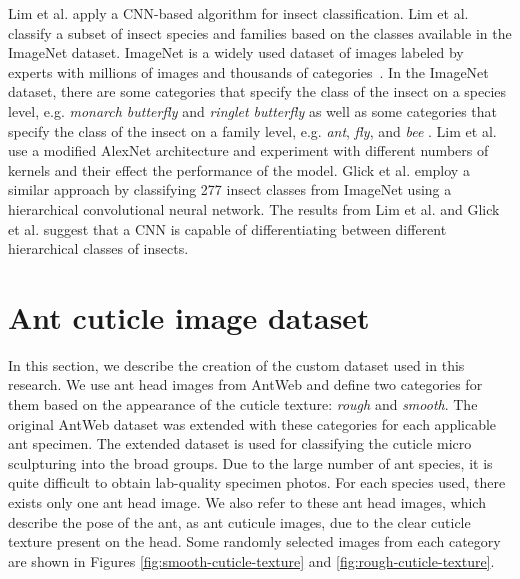 \documentclass{aci}
\numberwithin{equation}{section}
\begin{document}
Lim et al. \cite{lim_performance_2017} apply a CNN-based algorithm for insect
classification. Lim et al. \cite{lim_performance_2017} classify a subset of
insect species and families based on the classes available in the ImageNet
dataset. ImageNet is a widely used dataset of images labeled by experts with
millions of images and thousands of categories~\cite{deng_imagenet_2009}. In the
ImageNet dataset, there are some categories that specify the class of the insect
on a species level, e.g. \textit{monarch butterfly} and \textit{ringlet
    butterfly} as well as some categories that specify the class of the insect on a
family level, e.g. \textit{ant}, \textit{fly}, and \textit{bee}
\cite{deng_imagenet_2009}. Lim et al. \cite{lim_performance_2017} use a modified
AlexNet architecture and experiment with different numbers of kernels and their
effect the performance of the model. Glick et al. \cite{glick_insect_2016}
employ a similar approach by classifying 277 insect classes from ImageNet using
a hierarchical convolutional neural network. The results from Lim et al.
\cite{lim_performance_2017} and Glick et al. \cite{glick_insect_2016} suggest
that a CNN is capable of differentiating between different hierarchical classes
of insects.

\section{Ant cuticle image dataset}


In this section, we describe the creation of the custom dataset used in this
research. We use ant head images from AntWeb \cite{perrichot_antweb_2012} and
define two categories for them based on the appearance of the cuticle texture:
\textit{rough} and \textit{smooth}. The original AntWeb dataset was extended
with these categories for each applicable ant specimen. The extended dataset is
used for classifying the cuticle micro sculpturing into the broad groups. Due to
the large number of ant species, it is quite difficult to obtain lab-quality
specimen photos. For each species used, there exists only one ant head image. We
also refer to these ant head images, which describe the pose of the ant, as ant
cuticule images, due to the clear cuticle texture present on the head. Some
randomly selected images from each category are shown in Figures
\ref{fig:smooth-cuticle-texture} and \ref{fig:rough-cuticle-texture}.
\end{document}
